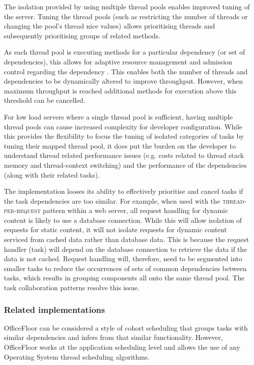 \documentclass[prodmode]{style/acmlarge}
\begin{document}
The isolation provided by using multiple thread pools enables improved tuning of
the server.  Tuning the thread pools (such as restricting the number of threads
or changing the pool's thread nice values) allows prioritising threads and
subsequently prioritising groups of related methods.

As each thread pool is executing methods for a particular dependency (or set
of dependencies), this allows for adaptive resource management and admission
control regarding the dependency \cite{seda}.  This enables both the number of
threads and dependencies to be dynamically altered to improve throughput.
However, when maximum throughput is reached additional methods for execution
above this threshold can be cancelled.

For low load servers where a single thread pool is sufficient, having multiple
thread pools can cause increased complexity for developer configuration.  While
this provides the flexibility to focus the tuning of isolated categories of
tasks by tuning their mapped thread pool, it does put the burden on the
developer to understand thread related performance issues (e.g. costs related to
thread stack memory and thread-context switching) and the performance of the
dependencies (along with their related tasks).

The implementation looses its ability to effectively prioritise and cancel tasks
if the task dependencies are too similar.  For example, when used with the
\textsc{thread-per-request} pattern within a web server, all request handling
for dynamic content is likely to use a database connection.  While this will
allow isolation of requests for static content, it will not isolate requests for
dynamic content serviced from cached data rather than database data.  This is
because the request handler (task) will depend on the database connection to
retrieve the data if the data is not cached.  Request handling will, therefore,
need to be segmented into smaller tasks to reduce the occurrences of sets of
common dependencies between tasks, which results in grouping components all onto
the same thread pool.  The task collaboration patterns resolve this issue.


\subsubsection*{Related implementations}

OfficeFloor can be considered a style of cohort scheduling \cite{cohort}
that groups tasks with similar dependencies and infers from that similar
functionality.  However, OfficeFloor works at the application scheduling
level and allows the use of any Operating System thread scheduling algorithms.
\end{document}
